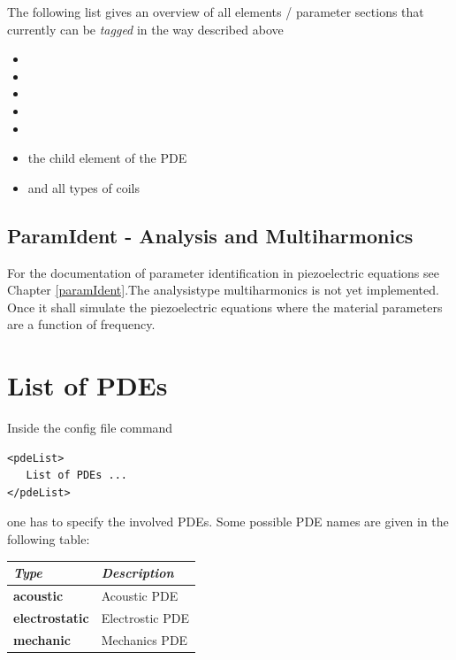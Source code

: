 \begin{itemize}
      The following list gives an overview of all elements / parameter
      sections that currently can be \emph{tagged} in the way described above
      \begin{itemize}
      \item {}
      \item {}
      \item {}
      \item {}
      \item {}
      \item the  child element of the  PDE
      \item and all types of coils
      \end{itemize}
 
\end{itemize}
%
\subsection{ParamIdent - Analysis and Multiharmonics}
%
For the documentation of parameter identification in piezoelectric equations
see Chapter \ref{paramIdent}.The analysistype multiharmonics is not yet
implemented. Once it shall simulate the piezoelectric equations where the
material parameters are a function of frequency.
%
%
\section{List of PDEs}
Inside the config file command
\begin{verbatim}
<pdeList>
   List of PDEs ...
</pdeList>
\end{verbatim}
one has to specify the involved PDEs.  Some possible PDE names are
given in the following table: 

\begin{center}
  \begin{tabular}{l|l}
    {\it Type}      & {\it Description}  \\\hline
    {\bf acoustic}     & Acoustic PDE  \\
    {\bf electrostatic} & Electrostic PDE \\
    {\bf mechanic}     & Mechanics PDE\\    
  \end{tabular}
\end{center}

